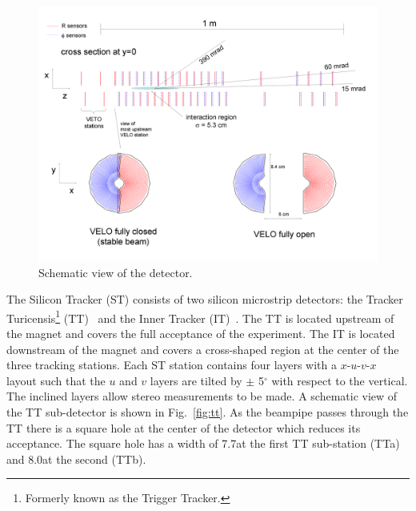 \begin{figure}[!tb]
\centering
\includegraphics[width=\textwidth]{figs/detector/velo.png}
\caption{Schematic view of the \velo detector.}
\label{fig:velo}
\end{figure}

The Silicon Tracker (ST) consists of two silicon microstrip detectors: the Tracker Turicensis\footnote{Formerly known as the Trigger Tracker.} (TT)~\cite{lhcb-tdr} and the Inner Tracker (IT)~\cite{it-tdr}. The TT is located upstream of the magnet and covers the full acceptance of the experiment. The IT is located downstream of the magnet and covers a cross-shaped region at the center of the three tracking stations. Each ST station contains four layers with a \mbox{$x$-$u$-$v$-$x$} layout such that the $u$ and $v$ layers are tilted by $\pm$ 5$^{\circ}$ with respect to the vertical. The inclined layers allow stereo measurements to be made. A schematic view of the TT sub-detector is shown in Fig.~\ref{fig:tt}. As the beampipe passes through the TT there is a square hole at the center of the detector which reduces its acceptance. The square hole has a width of 7.7\cm at the first TT sub-station (TTa) and 8.0\cm at the second (TTb).

